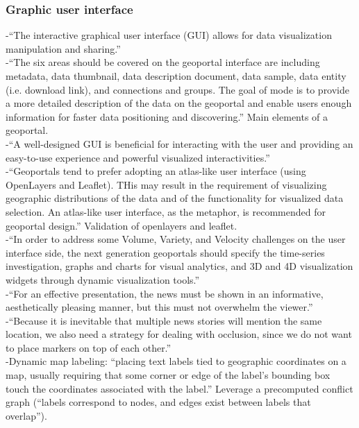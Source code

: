 \subsubsection{Graphic user interface}
-{\color{orange}“The interactive graphical user interface (GUI) allows for data visualization manipulation and sharing.”}\cite{Bhattacharya2018}\\
-{\color{orange}“The six areas should be covered on the geoportal interface are including metadata, data thumbnail, data description document, data sample, data entity (i.e. download link), and connections and groups. The goal of mode is to provide a more detailed description of the data on the geoportal and enable users enough information for faster data positioning and discovering.” Main elements of a geoportal.\cite{Jiang2020}}\\
-{\color{orange}“A well-designed GUI is beneficial for interacting with the user and providing an easy-to-use experience and powerful visualized interactivities.”\cite{Jiang2020}}\\
-{\color{orange}“Geoportals tend to prefer adopting an atlas-like user interface (using OpenLayers and Leaflet). THis may result in the requirement of visualizing geographic distributions of the data and of the functionality for visualized data selection. An atlas-like user interface, as the metaphor, is recommended for geoportal design.” Validation of openlayers and leaflet.\cite{Jiang2020}}\\
-{\color{orange}“In order to address some Volume, Variety, and Velocity challenges on the user interface side, the next generation geoportals should specify the time-series investigation, graphs and charts for visual analytics, and 3D and 4D visualization widgets through dynamic visualization tools.”\cite{Jiang2020}}\\
-{\color{orange}“For an effective presentation, the news must be shown in an informative, aesthetically pleasing manner, but this must not overwhelm the viewer.”\cite{Teitler2008}}\\
-{\color{orange}“Because it is inevitable that multiple news stories will mention the same location, we also need a strategy for dealing with occlusion, since we do not want to place markers on top of each other.”\cite{Teitler2008}}\\
-{\color{orange}Dynamic map labeling: “placing text labels tied to geographic coordinates on a map, usually requiring that some corner or edge of the label’s bounding box touch the coordinates associated with the label.”  Leverage a precomputed conflict graph (“labels correspond to nodes, and edges exist between labels that overlap”).\cite{Teitler2008}}\\
